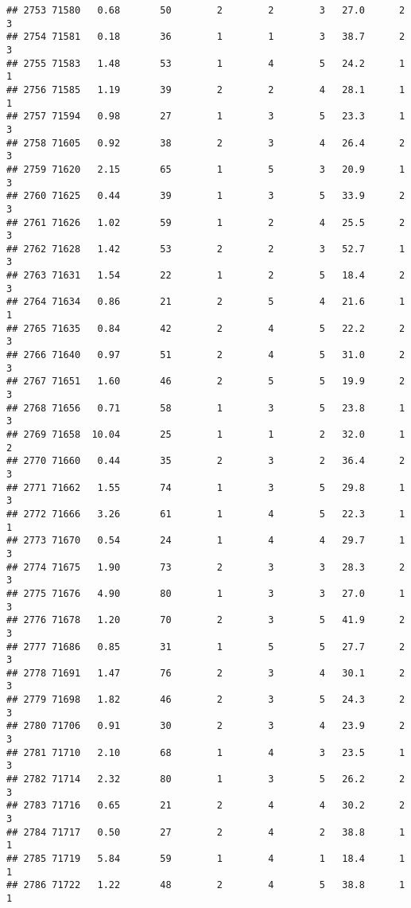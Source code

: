 \documentclass[
]{article}
\begin{document}
\begin{verbatim}
## 2753 71580   0.68       50        2        2        3   27.0      2      3
## 2754 71581   0.18       36        1        1        3   38.7      2      3
## 2755 71583   1.48       53        1        4        5   24.2      1      1
## 2756 71585   1.19       39        2        2        4   28.1      1      1
## 2757 71594   0.98       27        1        3        5   23.3      1      3
## 2758 71605   0.92       38        2        3        4   26.4      2      3
## 2759 71620   2.15       65        1        5        3   20.9      1      3
## 2760 71625   0.44       39        1        3        5   33.9      2      3
## 2761 71626   1.02       59        1        2        4   25.5      2      3
## 2762 71628   1.42       53        2        2        3   52.7      1      3
## 2763 71631   1.54       22        1        2        5   18.4      2      3
## 2764 71634   0.86       21        2        5        4   21.6      1      1
## 2765 71635   0.84       42        2        4        5   22.2      2      3
## 2766 71640   0.97       51        2        4        5   31.0      2      3
## 2767 71651   1.60       46        2        5        5   19.9      2      3
## 2768 71656   0.71       58        1        3        5   23.8      1      3
## 2769 71658  10.04       25        1        1        2   32.0      1      2
## 2770 71660   0.44       35        2        3        2   36.4      2      3
## 2771 71662   1.55       74        1        3        5   29.8      1      3
## 2772 71666   3.26       61        1        4        5   22.3      1      1
## 2773 71670   0.54       24        1        4        4   29.7      1      3
## 2774 71675   1.90       73        2        3        3   28.3      2      3
## 2775 71676   4.90       80        1        3        3   27.0      1      3
## 2776 71678   1.20       70        2        3        5   41.9      2      3
## 2777 71686   0.85       31        1        5        5   27.7      2      3
## 2778 71691   1.47       76        2        3        4   30.1      2      3
## 2779 71698   1.82       46        2        3        5   24.3      2      3
## 2780 71706   0.91       30        2        3        4   23.9      2      3
## 2781 71710   2.10       68        1        4        3   23.5      1      3
## 2782 71714   2.32       80        1        3        5   26.2      2      3
## 2783 71716   0.65       21        2        4        4   30.2      2      3
## 2784 71717   0.50       27        2        4        2   38.8      1      1
## 2785 71719   5.84       59        1        4        1   18.4      1      1
## 2786 71722   1.22       48        2        4        5   38.8      1      1

\end{verbatim}
\end{document}
